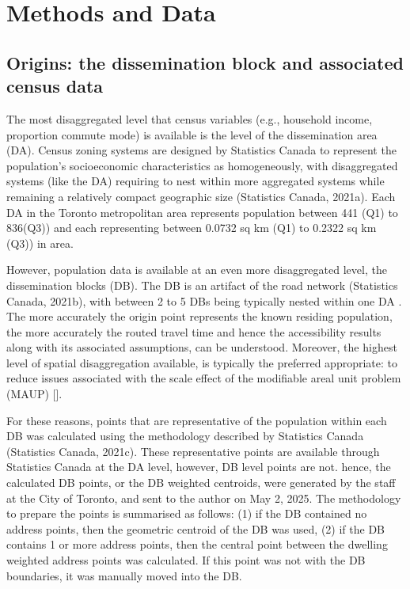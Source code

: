 \documentclass[
11pt, %
oneside, %
english, %
singlespacing, %
]{macthesis} %
\begin{document}
\section{Methods and Data}\label{methods-and-data}

\subsection{Origins: the dissemination block and associated census data}\label{origins-the-dissemination-block-and-associated-census-data}

The most disaggregated level that census variables (e.g., household income, proportion commute mode) is available is the level of the dissemination area (DA). Census zoning systems are designed by Statistics Canada to represent the population's socioeconomic characteristics as homogeneously, with disaggregated systems (like the DA) requiring to nest within more aggregated systems while remaining a relatively compact geographic size (Statistics Canada, 2021a). Each DA in the Toronto metropolitan area represents population between 441 (Q1) to 836(Q3)) and each representing between 0.0732 sq km (Q1) to 0.2322 sq km (Q3)) in area.

However, population data is available at an even more disaggregated level, the dissemination blocks (DB). The DB is an artifact of the road network (Statistics Canada, 2021b), with between 2 to 5 DBs being typically nested within one DA . The more accurately the origin point represents the known residing population, the more accurately the routed travel time and hence the accessibility results along with its associated assumptions, can be understood. Moreover, the highest level of spatial disaggregation available, is typically the preferred appropriate: to reduce issues associated with the scale effect of the modifiable areal unit problem (MAUP) {[}{]}.

For these reasons, points that are representative of the population within each DB was calculated using the methodology described by Statistics Canada (Statistics Canada, 2021c). These representative points are available through Statistics Canada at the DA level, however, DB level points are not. hence, the calculated DB points, or the DB weighted centroids, were generated by the staff at the City of Toronto, and sent to the author on May 2, 2025. The methodology to prepare the points is summarised as follows: (1) if the DB contained no address points, then the geometric centroid of the DB was used, (2) if the DB contains 1 or more address points, then the central point between the dwelling weighted address points was calculated. If this point was not with the DB boundaries, it was manually moved into the DB.
\end{document}
